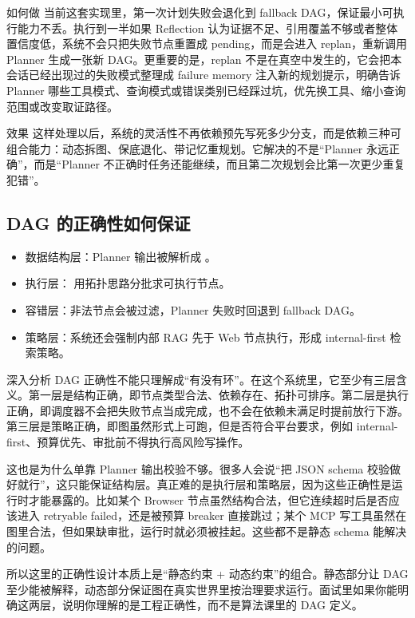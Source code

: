 \documentclass[12pt]{article}
\begin{document}
\begin{qaBox}{如何做}
当前这套实现里，第一次计划失败会退化到 fallback DAG，保证最小可执行能力不丢。执行到一半如果 Reflection 认为证据不足、引用覆盖不够或者整体置信度低，系统不会只把失败节点重置成 pending，而是会进入 replan，重新调用 Planner 生成一张新 DAG。更重要的是，replan 不是在真空中发生的，它会把本会话已经出现过的失败模式整理成 failure memory 注入新的规划提示，明确告诉 Planner 哪些工具模式、查询模式或错误类别已经踩过坑，优先换工具、缩小查询范围或改变取证路径。
\end{qaBox}

\begin{qaBox}{效果}
这样处理以后，系统的灵活性不再依赖预先写死多少分支，而是依赖三种可组合能力：动态拆图、保底退化、带记忆重规划。它解决的不是“Planner 永远正确”，而是“Planner 不正确时任务还能继续，而且第二次规划会比第一次更少重复犯错”。
\end{qaBox}

\subsection{DAG 的正确性如何保证}
\begin{itemize}[leftmargin=2em]
  \item 数据结构层：Planner 输出被解析成 。
  \item 执行层： 用拓扑思路分批求可执行节点。
  \item 容错层：非法节点会被过滤，Planner 失败时回退到 fallback DAG。
  \item 策略层：系统还会强制内部 RAG 先于 Web 节点执行，形成 internal-first 检索策略。
\end{itemize}

\begin{analysisBox}{深入分析}
DAG 正确性不能只理解成“有没有环”。在这个系统里，它至少有三层含义。第一层是结构正确，即节点类型合法、依赖存在、拓扑可排序。第二层是执行正确，即调度器不会把失败节点当成完成，也不会在依赖未满足时提前放行下游。第三层是策略正确，即图虽然形式上可跑，但是否符合平台要求，例如 internal-first、预算优先、审批前不得执行高风险写操作。

这也是为什么单靠 Planner 输出校验不够。很多人会说“把 JSON schema 校验做好就行”，这只能保证结构层。真正难的是执行层和策略层，因为这些正确性是运行时才能暴露的。比如某个 Browser 节点虽然结构合法，但它连续超时后是否应该进入 retryable failed，还是被预算 breaker 直接跳过；某个 MCP 写工具虽然在图里合法，但如果缺审批，运行时就必须被挂起。这些都不是静态 schema 能解决的问题。

所以这里的正确性设计本质上是“静态约束 + 动态约束”的组合。静态部分让 DAG 至少能被解释，动态部分保证图在真实世界里按治理要求运行。面试里如果你能明确这两层，说明你理解的是工程正确性，而不是算法课里的 DAG 定义。
\end{analysisBox}
\end{document}
